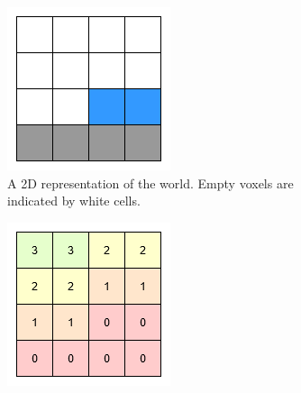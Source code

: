 \begin{figure}[htbp]
    \centering
    \begin{subfigure}{0.49\textwidth}
        \centering
        \includegraphics[width=\textwidth]{figures/voxel_grid.drawio.png}
        \caption{A 2D representation of the world. Empty voxels are indicated by white cells.}
        \label{fig:voxel_grid}
    \end{subfigure}
    \hfill
    \begin{subfigure}{0.49\textwidth}
        \centering
        \includegraphics[width=\textwidth]{figures/voxel_grid_df.drawio.png}

\end{subfigure}
\end{figure}
